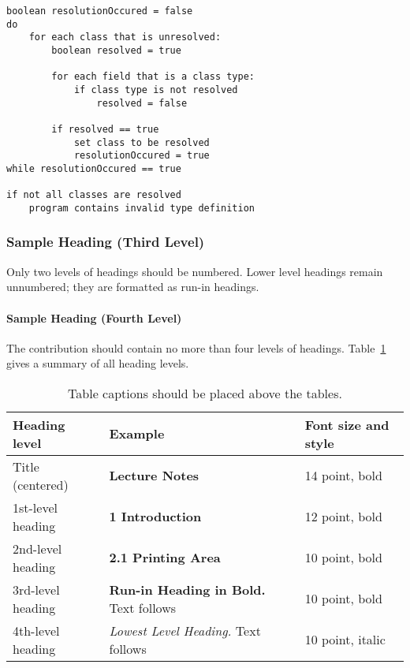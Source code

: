 \documentclass[runningheads]{llncs}
\begin{document}
\begin{verbatim}
boolean resolutionOccured = false
do 
    for each class that is unresolved:
        boolean resolved = true

        for each field that is a class type:
            if class type is not resolved 
                resolved = false
        
        if resolved == true
            set class to be resolved
            resolutionOccured = true
while resolutionOccured == true

if not all classes are resolved
    program contains invalid type definition
\end{verbatim}


\subsubsection{Sample Heading (Third Level)}
Only two levels of headings should be numbered. Lower level headings remain unnumbered; they are 
formatted as run-in headings.

\paragraph{Sample Heading (Fourth Level)}
The contribution should contain no more than four levels of headings. Table~\ref{tab1} gives a 
summary of all heading levels.

\begin{table}
    \caption{Table captions should be placed above the tables.}
    \label{tab1}
    \begin{tabular}{|l|l|l|}
        \hline
        Heading level     & Example                                          & Font size and style \\
        \hline
        Title (centered)  & {\Large\bfseries Lecture Notes}                  & 14 point, bold      \\
        1st-level heading & {\large\bfseries 1 Introduction}                 & 12 point, bold      \\
        2nd-level heading & {\bfseries 2.1 Printing Area}                    & 10 point, bold      \\
        3rd-level heading & {\bfseries Run-in Heading in Bold.} Text follows & 10 point, bold      \\
        4th-level heading & {\itshape Lowest Level Heading.} Text follows    & 10 point, italic    \\
        \hline
    \end{tabular}
\end{table}
\end{document}
